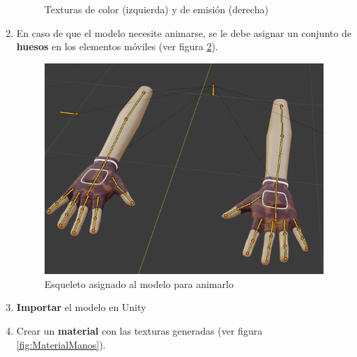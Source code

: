 \begin{enumerate}
\begin{figure}[h]
	\caption{Texturas de color (izquierda) y de emisión (derecha)}
	\label{fig:texturasManos}
    \end{figure}
    \item En caso de que el modelo necesite animarse, se le debe asignar un conjunto de \textbf{huesos} en los elementos móviles (ver figura \ref{fig:HuesosManos}).
    \begin{figure}[h]
	\centering
	\includegraphics[scale=0.4]{img/ArmsBones.png}
	\caption{Esqueleto asignado al modelo para animarlo}
	\label{fig:HuesosManos}
    \end{figure}
    \item \textbf{Importar} el modelo en Unity
    \item Crear un \textbf{material} con las texturas generadas (ver figura \ref{fig:MaterialManos}).
    \begin{figure}[h]
	\centering

\end{figure}
\end{enumerate}
